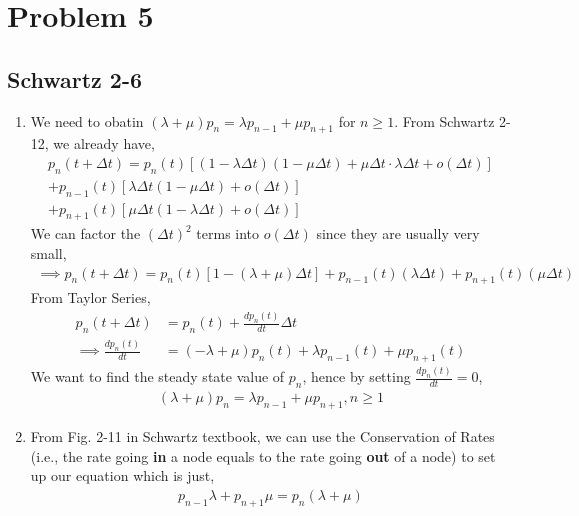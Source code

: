 \documentclass{article}
\begin{document}
	\section*{Problem 5}
		\subsection*{Schwartz 2-6}
			\begin{enumerate}
				\item We need to obatin $(\lambda + \mu) p_{n} = \lambda p_{n-1} + \mu p_{n+1}$
					for $n \geqslant 1$. From Schwartz 2-12, we already have,
					\begin{gather*}
						p_{n}(t + \Delta t) = p_{n}(t) [ (1 - \lambda \Delta t)(1 - \mu \Delta t) + \mu \Delta t \cdot \lambda \Delta t + o(\Delta t) ] \\
						+ p_{n-1}(t) [ \lambda \Delta t (1 - \mu \Delta t) + o(\Delta t) ] \\
						+ p_{n+1}(t) [ \mu \Delta t (1 - \lambda \Delta t) + o(\Delta t) ]
					\end{gather*}
					We can factor the $(\Delta t)^{2}$ terms into $o(\Delta t)$ since they
					are usually very small,
					\begin{gather*}
						\implies p_{n}(t + \Delta t) = p_{n}(t) [1 - (\lambda + \mu) \Delta t] + p_{n-1}(t) (\lambda \Delta t) + p_{n+1}(t) (\mu \Delta t)
					\end{gather*}
					From Taylor Series,
					\begin{align*}
						p_{n}(t + \Delta t) &= p_{n}(t) + \frac{dp_{n}(t)}{dt} \Delta t \\
						\implies \frac{dp_{n}(t)}{dt} &= (-\lambda + \mu) p_{n}(t) + \lambda p_{n-1}(t) + \mu p_{n+1}(t)
					\end{align*}
					We want to find the steady state value of $p_{n}$, hence by setting $\frac{dp_{n}(t)}{dt} = 0$,
					\begin{align*}
						(\lambda + \mu) p_{n} = \lambda p_{n-1} + \mu p_{n+1}, n \geqslant 1
					\end{align*}
				\item From Fig. 2-11 in Schwartz textbook, we can use the Conservation
					of Rates (i.e., the rate going \textbf{in} a node equals to the rate
					going \textbf{out} of a node) to set up our equation which is just,
					\begin{align*}
						p_{n-1}\lambda + p_{n+1}\mu = p_{n}(\lambda + \mu)
					\end{align*}
			\end{enumerate}
\end{document}
